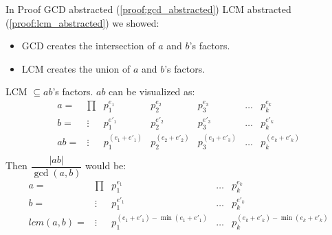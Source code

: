 \begin{Proof}



    \noindent
    In Proof GCD abstracted (\ref{proof:gcd_abstracted}) LCM abstracted (\ref{proof:lcm_abstracted}) we showed:
    \begin{itemize}
        \item GCD creates the intersection of $a$ and $b$'s factors.
        \item LCM creates the union of $a$ and $b$'s factors.
    \end{itemize}
    \noindent
    LCM $\subseteq ab$'s factors. $ab$ can be visualized as:
    \[
    \begin{array}{ccc|c|c|c|c}
    
    a=&\prod&p_1^{e_1} & p_2^{e_2} & p_3^{e_3} & \dots & p_k^{e_k} \\
    b=&\vdots&p_1^{e'_1} & p_2^{e'_2} & p_3^{e'_3} & \dots & p_k^{e'_k} \\
    \hline
    ab=&\vdots&p_1^{(e_1 + e'_1)} & p_2^{(e_2+ e'_2)} & p_3^{(e_3+ e'_3)} & \dots & p_k^{(e_k+ e'_k)} \\

    \end{array}
    \]
    Then $\dfrac{|ab|}{\gcd(a,b)}$ would be:\\
    \[
    \begin{array}{ccc|c|c}
    
    a=&\prod&p_1^{e_1} &  \dots & p_k^{e_k} \\
    b=&\vdots&p_1^{e'_1} &  \dots & p_k^{e'_k} \\
    \hline
    lcm(a,b)=&\vdots&p_1^{(e_1 + e'_1)-\min(e_1 + e'_1)} & \dots & p_k^{(e_k+ e'_k)-\min(e_k+ e'_k)} \\


\end{array}\]
\end{Proof}
